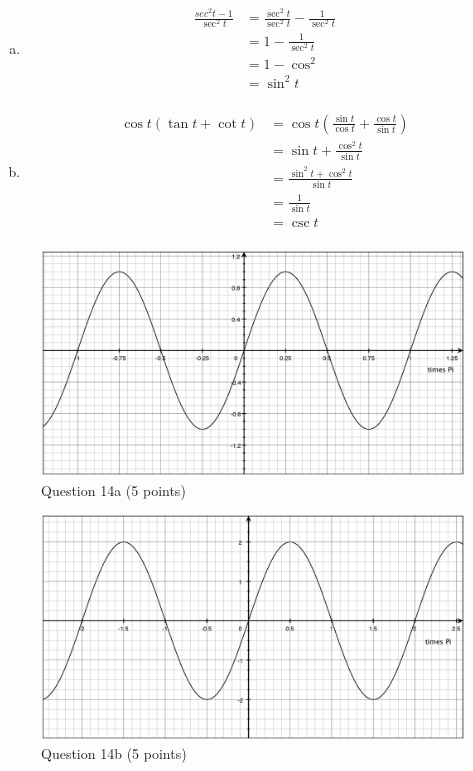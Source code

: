 \documentclass{exam}
\begin{document}
\begin{description}
\begin{enumerate}[(a)]
\item
\begin{align*}
  \frac{sec^2 t - 1}{\sec^2 t} &= \frac{\sec^2 t}{\sec^2 t} - \frac{1}{\sec^2 t} \\
    &= 1 - \frac{1}{\sec^2 t} \\
    &= 1 - \cos^2 \\
    &= \sin^2 t \\
\end{align*}

\item
\begin{align*}
  \cos t(\tan t + \cot t) &= \cos t \left( \frac{\sin t}{\cos t} + \frac{\cos t}{\sin t} \right) \\
  &= \sin t + \frac{\cos^2 t}{\sin t} \\
  &= \frac{\sin^2 t + \cos^2 t}{\sin t} \\
  &= \frac{1}{\sin t} \\
  &= \csc t \\
\end{align*}

\end{enumerate}

\item
\begin{figure}[H]
  \centering
  \includegraphics[scale=.3]{question_14a.eps}
  \caption*{Question 14a (5 points)}
\end{figure}

\item
\begin{figure}[H]
  \centering
  \includegraphics[scale=.3]{question_14b.eps}
  \caption*{Question 14b (5 points)}
\end{figure}


\end{description}
\end{document}
